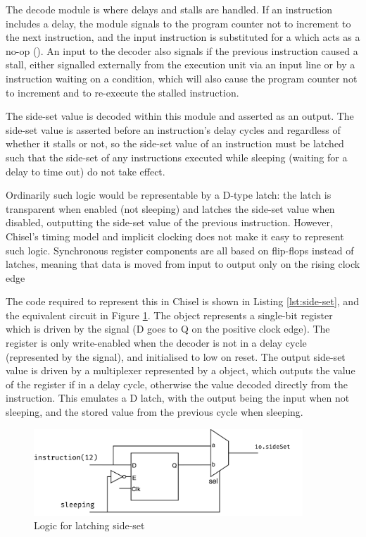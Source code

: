 The decode module is where delays and stalls are handled. If an instruction includes a delay, the module signals to the program counter not to increment to the next instruction, and the input instruction is substituted for a  which acts as a no-op (). An input to the decoder also signals if the previous instruction caused a stall, either signalled externally from the execution unit via an input line or by a  instruction waiting on a condition, which will also cause the program counter not to increment and to re-execute the stalled instruction.

The side-set value is decoded within this module and asserted as an output. The side-set value is asserted before an instruction's delay cycles and regardless of whether it stalls or not, so the side-set value of an instruction must be latched such that the side-set of any  instructions executed while sleeping (waiting for a delay to time out) do not take effect.

Ordinarily such logic would be representable by a D-type latch: the latch is transparent when enabled (not sleeping) and latches the side-set value when disabled, outputting the side-set value of the previous instruction. However, Chisel's timing model and implicit clocking does not make it easy to represent such logic. Synchronous register components are all based on flip-flops instead of latches, meaning that data is moved from input to output only on the rising clock edge

The code required to represent this in Chisel is shown in Listing \ref{lst:side-set}, and the equivalent circuit in Figure \ref{fig:side-set}. The  object represents a single-bit register which is driven by the  signal (D goes to Q on the positive clock edge). The register is only write-enabled when the decoder is not in a delay cycle (represented by the  signal), and initialised to low on reset. The output side-set value  is driven by a multiplexer represented by a  object, which outputs the value of the register if in a delay cycle, otherwise the value decoded directly from the instruction. This emulates a D latch, with the output being the input when not sleeping, and the stored value from the previous cycle when sleeping.

\begin{figure}[H]
    \centering
    \includegraphics[width=0.9\textwidth]{../img/side-set.png}
    \caption{Logic for latching side-set}
    \label{fig:side-set}
\end{figure}

